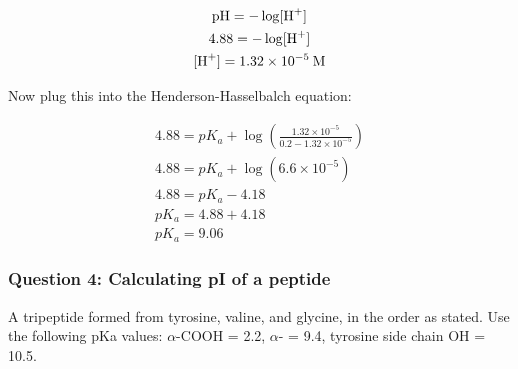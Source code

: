 \documentclass[letterpaper, 12pt]{article}
\begin{document}
\begin{gather*}
\text{pH} = -\log[\ce{H+}] \\
4.88 = -\log[\ce{H+}] \\
[\ce{H+}] = 1.32 \times 10^{-5} \: \text{M}
\end{gather*}

Now plug this into the Henderson-Hasselbalch equation:

\begin{gather*}
4.88 = pK_a + \log\left(\frac{1.32 \times 10^{-5}}{0.2-1.32 \times 10^{-5}}\right) \\
4.88 = pK_a + \log(6.6 \times 10^{-5}) \\
4.88 = pK_a - 4.18 \\
pK_a = 4.88 + 4.18 \\
pK_a = \boxed{9.06}
\end{gather*}

\subsubsection*{Question 4: Calculating pI of a peptide}

A tripeptide formed from tyrosine, valine, and glycine, in the order as stated. Use the following pKa values: $\alpha$-COOH = 2.2, $\alpha$- = 9.4, tyrosine side chain OH = 10.5.
\end{document}
